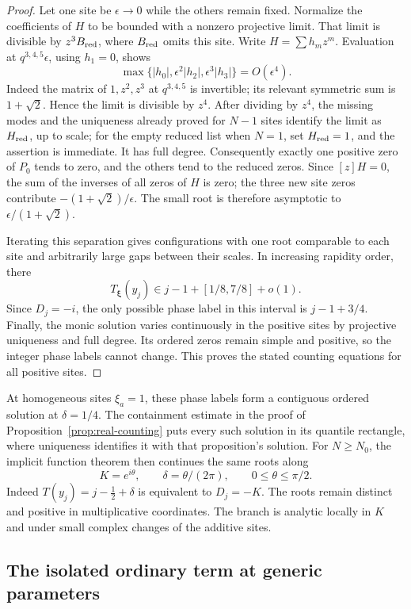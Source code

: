 \begin{proof}
Let one site be \(\epsilon\to0\) while the others remain fixed. Normalize the coefficients of \(H\) to be bounded with a nonzero projective limit. That limit is divisible by \(z^3B_{\rm red}\), where \(B_{\rm red}\) omits this site. Write \(H=\sum h_mz^m\). Evaluation at \(q^{3,4,5}\epsilon\), using \(h_1=0\), shows
\[
 \max\{|h_0|,\epsilon^2|h_2|,\epsilon^3|h_3|\}=O(\epsilon^4).
\]
Indeed the matrix of \(1,z^2,z^3\) at \(q^{3,4,5}\) is invertible; its relevant symmetric sum is \(1+\sqrt2\). Hence the limit is divisible by \(z^4\). After dividing by \(z^4\), the missing modes and the uniqueness already proved for \(N-1\) sites identify the limit as \(H_{\rm red}\), up to scale; for the empty reduced list when \(N=1\), set \(H_{\rm red}=1\), and the assertion is immediate. It has full degree. Consequently exactly one positive zero of \(P_0\) tends to zero, and the others tend to the reduced zeros. Since \([z]H=0\), the sum of the inverses of all zeros of \(H\) is zero; the three new site zeros contribute \(-(1+\sqrt2)/\epsilon\). The small root is therefore asymptotic to \(\epsilon/(1+\sqrt2)\).

Iterating this separation gives configurations with one root comparable to each site and arbitrarily large gaps between their scales. In increasing rapidity order, there
\[
 T_{\boldsymbol\xi}(y_j)\in
 j-1+[1/8,7/8]+o(1).
\]
Since \(D_j=-i\), the only possible phase label in this interval is \(j-1+3/4\). Finally, the monic solution varies continuously in the positive sites by projective uniqueness and full degree. Its ordered zeros remain simple and positive, so the integer phase labels cannot change. This proves the stated counting equations for all positive sites.
\end{proof}

At homogeneous sites \(\xi_a=1\), these phase labels form a contiguous ordered solution at \(\delta=1/4\). The containment estimate in the proof of Proposition~\ref{prop:real-counting} puts every such solution in its quantile rectangle, where uniqueness identifies it with that proposition's solution. For \(N\ge N_0\), the implicit function theorem then continues the same roots along
\[
 K=e^{i\theta},\qquad \delta=\theta/(2\pi),\qquad
 0\le\theta\le\pi/2.
\]
Indeed \(T(y_j)=j-\tfrac12+\delta\) is equivalent to \(D_j=-K\). The roots remain distinct and positive in multiplicative coordinates. The branch is analytic locally in \(K\) and under small complex changes of the additive sites.

\subsection{The isolated ordinary term at generic parameters}


